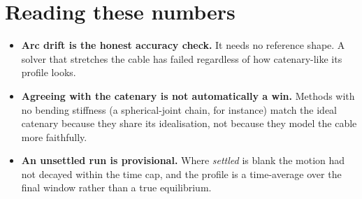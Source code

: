 \documentclass[11pt,a4paper]{article}
\begin{document}
\section{Reading these numbers}

\begin{itemize}
  \item \textbf{Arc drift is the honest accuracy check.} It needs no
        reference shape. A solver that stretches the cable has failed
        regardless of how catenary-like its profile looks.
  \item \textbf{Agreeing with the catenary is not automatically a win.}
        Methods with no bending stiffness (a spherical-joint chain, for
        instance) match the ideal catenary because they share its idealisation,
        not because they model the cable more faithfully.
  \item \textbf{An unsettled run is provisional.} Where \emph{settled} is
        blank the motion had not decayed within the time cap, and the profile
        is a time-average over the final window rather than a true equilibrium.
\end{itemize}
\end{document}
